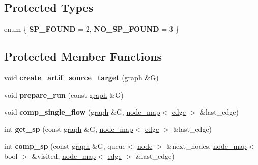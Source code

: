 \subsection*{Protected Types}
\begin{DoxyCompactItemize}
\item 
\mbox{\label{classmaxflow__ff_a08dc6e5c5fe20a9f9d93721f8c273592}} 
enum \{ {\bfseries S\+P\+\_\+\+F\+O\+U\+ND} = 2, 
{\bfseries N\+O\+\_\+\+S\+P\+\_\+\+F\+O\+U\+ND} = 3
 \}
\end{DoxyCompactItemize}
\subsection*{Protected Member Functions}
\begin{DoxyCompactItemize}
\item 
\mbox{\label{classmaxflow__ff_ad2634e4325012773d793e9cf8f1a3dcf}} 
void {\bfseries create\+\_\+artif\+\_\+source\+\_\+target} (\mbox{\hyperlink{classgraph}{graph}} \&G)
\item 
\mbox{\label{classmaxflow__ff_a8ad20b45a7d30070bb65e68758c2f7d3}} 
void {\bfseries prepare\+\_\+run} (const \mbox{\hyperlink{classgraph}{graph}} \&G)
\item 
\mbox{\label{classmaxflow__ff_a22a432bb072e0410f20bb418dfd4d3a9}} 
void {\bfseries comp\+\_\+single\+\_\+flow} (\mbox{\hyperlink{classgraph}{graph}} \&G, \mbox{\hyperlink{classnode__map}{node\+\_\+map}}$<$ \mbox{\hyperlink{classedge}{edge}} $>$ \&last\+\_\+edge)
\item 
\mbox{\label{classmaxflow__ff_a532b1285a791d23ab318791bc093fde7}} 
int {\bfseries get\+\_\+sp} (const \mbox{\hyperlink{classgraph}{graph}} \&G, \mbox{\hyperlink{classnode__map}{node\+\_\+map}}$<$ \mbox{\hyperlink{classedge}{edge}} $>$ \&last\+\_\+edge)
\item 
\mbox{\label{classmaxflow__ff_a3a9d93d6796ae0846d0137aa46f29c30}} 
int {\bfseries comp\+\_\+sp} (const \mbox{\hyperlink{classgraph}{graph}} \&G, queue$<$ \mbox{\hyperlink{classnode}{node}} $>$ \&next\+\_\+nodes, \mbox{\hyperlink{classnode__map}{node\+\_\+map}}$<$ bool $>$ \&visited, \mbox{\hyperlink{classnode__map}{node\+\_\+map}}$<$ \mbox{\hyperlink{classedge}{edge}} $>$ \&last\+\_\+edge)

\end{DoxyCompactItemize}
